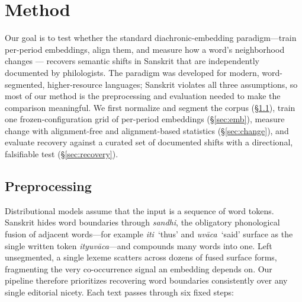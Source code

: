 \section{Method}
\label{sec:method}

Our goal is to test whether the standard diachronic-embedding paradigm---train per-period
embeddings, align them, and measure how a word's neighborhood changes \citep{hamilton2016}---%
recovers semantic shifts in Sanskrit that are independently documented by philologists. The
paradigm was developed for modern, word-segmented, higher-resource languages; Sanskrit
violates all three assumptions, so most of our method is the preprocessing and evaluation
needed to make the comparison meaningful. We first normalize and segment the corpus
(\S\ref{sec:prep}), train one frozen-configuration grid of per-period embeddings
(\S\ref{sec:emb}), measure change with alignment-free and alignment-based statistics
(\S\ref{sec:change}), and evaluate recovery against a curated set of documented shifts with a
directional, falsifiable test (\S\ref{sec:recovery}).

\subsection{Preprocessing}
\label{sec:prep}
Distributional models assume that the input is a sequence of word tokens. Sanskrit hides word
boundaries through \textit{sandhi}, the obligatory phonological fusion of adjacent words---for
example \textit{iti}~`thus' and \textit{uv\=aca}~`said' surface as the single written token
\textit{ityuv\=aca}---and compounds many words into one. Left unsegmented, a single lexeme
scatters across dozens of fused surface forms, fragmenting the very co-occurrence signal an
embedding depends on. Our pipeline therefore prioritizes recovering word boundaries
consistently over any single editorial nicety. Each text passes through six fixed steps:

